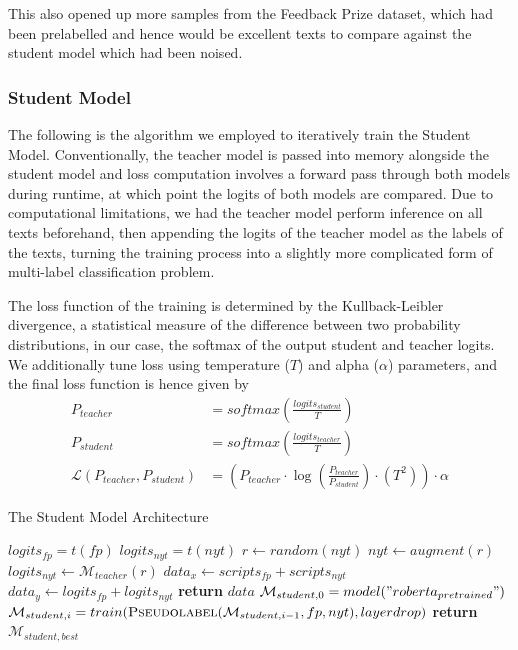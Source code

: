 \documentclass[12pt]{article}
\begin{document}
{This also opened up more samples from the Feedback Prize dataset, which had been prelabelled and hence would be excellent texts to compare against the student model which had been noised.
\subsubsection{Student Model}

The following is the algorithm we employed to iteratively train the Student Model. Conventionally, the teacher model is passed into memory alongside the student model and loss computation involves a forward pass through both models during runtime, at which point the logits of both models are compared. Due to computational limitations, we had the teacher model perform inference on all texts beforehand, then appending the logits of the teacher model as the labels of the texts, turning the training process into a slightly more complicated form of multi-label classification problem.

The loss function of the training is determined by the Kullback-Leibler divergence\cite{kullback1997information}, a statistical measure of the difference between two probability distributions, in our case, the softmax of the output student and teacher logits. We additionally tune loss using temperature ($T$) and alpha ($\alpha$) parameters, and the final loss function is hence given by
\begin{align*}
P_{teacher} &= softmax(\frac{logits_{student}}{T})\\ P_{student} &= softmax(\frac{logits_{teacher}}{T})\\
\mathcal{L}(P_{teacher}, P_{student}) &= (P_{teacher}\cdot\log(\frac{P_{teacher}}{P_{student}})\cdot(T^2))\cdot\alpha
\end{align*}

\begin{algorithm}[H]
\caption{The Student Model Architecture}
\label{alg:studentmodel}
\begin{algorithmic}[1]
     
        \State $logits_{fp} = t(fp)$
        \State $logits_{nyt} = t(nyt)$
            \State $r \gets random(nyt)$
            \State $nyt \gets augment(r)$
            \State $logits_{nyt} \gets \mathcal{M}_{teacher}(r)$
        \EndWhile
        \State $data_{x} \gets scripts_{fp} + scripts_{nyt}$
        \State $data_{y} \gets logits_{fp} + logits_{nyt}$
        \State \textbf{return} $data$
    \EndProcedure
    \newline
    \State $\mathcal{M}_{student,0} = model("roberta_{pretrained}")$ 
    \State $\mathcal{M}_{student,i} = train(\textsc{Pseudolabel}(\mathcal{M}_{student,i-1}, fp, nyt), layerdrop)$
    \EndFor
    \State \textbf{return} $\mathcal{M}_{student, best}$
    \EndProcedure
\end{algorithmic}
\end{algorithm}



}
\end{document}
